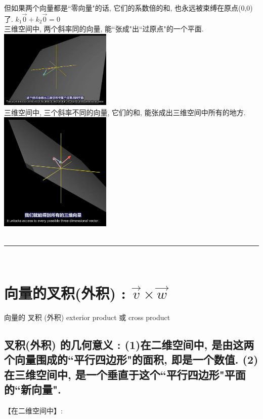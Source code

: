 \documentclass[UTF8]{ctexart}
\begin{document}
但如果两个向量都是``零向量"的话, 它们的系数倍的和, 也永远被束缚在原点(0,0)了. $ k_1 \vec{0}  +  k_2 \vec{0}=0$ \\

三维空间中, 两个斜率同的向量, 能``张成"出``过原点"的一个平面.\\
\includegraphics[width=0.4\textwidth]{img/0071.png}\\

三维空间中, 三个斜率不同的向量, 它们的和, 能张成出三维空间中所有的地方. \\
\includegraphics[width=0.4\textwidth]{img/0072.png}\\


~\\
\hrule
~\\

\section{向量的叉积(外积) : $\vec{v} \times \vec{w}$}

向量的 叉积 (外积) exterior product 或  cross product



\subsection{叉积(外积) 的几何意义 : (1)在二维空间中, 是由这两个向量围成的``平行四边形"的面积, 即是一个数值. (2)在三维空间中, 是一个垂直于这个``平行四边形"平面的``新向量".}

【在二维空间中】: \\
\end{document}
